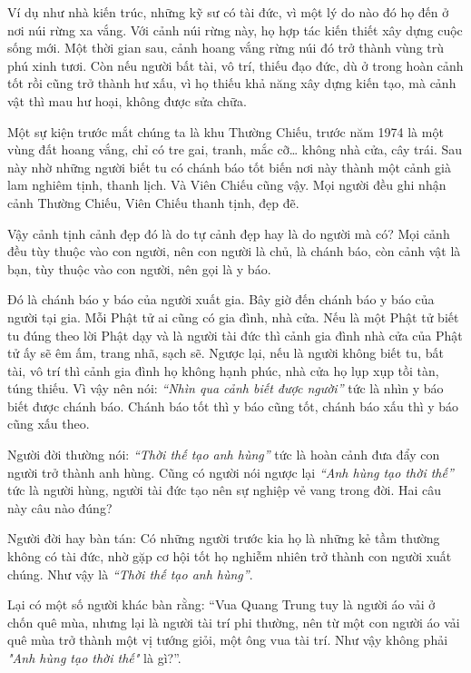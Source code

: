 \documentclass[
  12pt,
  oneside]{book}
\begin{document}
Ví dụ như nhà kiến trúc, những kỹ sư có tài đức, vì một lý do nào đó họ đến ở nơi núi rừng xa vắng. Với cảnh núi rừng này, họ hợp tác kiến thiết xây dựng cuộc sống mới. Một thời gian sau, cảnh hoang vắng rừng núi đó trở thành vùng trù phú xinh tươi. Còn nếu người bất tài, vô trí, thiếu đạo đức, dù ở trong hoàn cảnh tốt rồi cũng trở thành hư xấu, vì họ thiếu khả năng xây dựng kiến tạo, mà cảnh vật thì mau hư hoại, không được sửa chữa.

Một sự kiện trước mắt chúng ta là khu Thường Chiếu, trước năm 1974 là một vùng đất hoang vắng, chỉ có tre gai, tranh, mắc cỡ\ldots{} không nhà cửa, cây trái. Sau này nhờ những người biết tu có chánh báo tốt biến nơi này thành một cảnh già lam nghiêm tịnh, thanh lịch. Và Viên Chiếu cũng vậy. Mọi người đều ghi nhận cảnh Thường Chiếu, Viên Chiếu thanh tịnh, đẹp đẽ.

Vậy cảnh tịnh cảnh đẹp đó là do tự cảnh đẹp hay là do người mà có? Mọi cảnh đều tùy thuộc vào con người, nên con người là chủ, là chánh báo, còn cảnh vật là bạn, tùy thuộc vào con người, nên gọi là y báo.

Đó là chánh báo y báo của người xuất gia. Bây giờ đến chánh báo y báo của người tại gia. Mỗi Phật tử ai cũng có gia đình, nhà cửa. Nếu là một Phật tử biết tu đúng theo lời Phật dạy và là người tài đức thì cảnh gia đình nhà cửa của Phật tử ấy sẽ êm ấm, trang nhã, sạch sẽ. Ngược lại, nếu là người không biết tu, bất tài, vô trí thì cảnh gia đình họ không hạnh phúc, nhà cửa họ lụp xụp tồi tàn, túng thiếu. Vì vậy nên nói: \emph{``Nhìn qua cảnh biết được người''} tức là nhìn y báo biết được chánh báo. Chánh báo tốt thì y báo cũng tốt, chánh báo xấu thì y báo cũng xấu theo.

Người đời thường nói: \emph{``Thời thế tạo anh hùng''} tức là hoàn cảnh đưa đẩy con người trở thành anh hùng. Cũng có người nói ngược lại \emph{``Anh hùng tạo thời thế''} tức là người hùng, người tài đức tạo nên sự nghiệp vẻ vang trong đời. Hai câu này câu nào đúng?

Người đời hay bàn tán: Có những người trước kia họ là những kẻ tầm thường không có tài đức, nhờ gặp cơ hội tốt họ nghiễm nhiên trở thành con người xuất chúng. Như vậy là \emph{``Thời thế tạo anh hùng''}.

Lại có một số người khác bàn rằng: ``Vua Quang Trung tuy là người áo vải ở chốn quê mùa, nhưng lại là người tài trí phi thường, nên từ một con người áo vải quê mùa trở thành một vị tướng giỏi, một ông vua tài trí. Như vậy không phải \emph{"Anh hùng tạo thời thế"} là gì?''.
\end{document}

